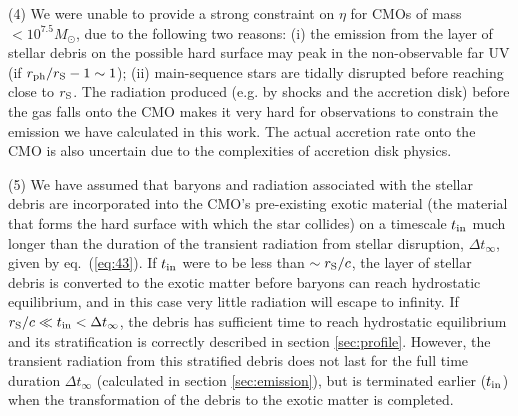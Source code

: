 \documentclass[useAMS,usenatbib]{mn2e}
\begin{document}
(4) We were unable to provide a strong constraint on $\eta$ for CMOs of
mass $< 10^{7.5} M_{\odot}$, due to the following two reasons: (i) the
emission from the layer of stellar debris on the possible hard surface
may peak in the non-observable far UV (if $r_{\rm ph}/r_{\rm
  S}-1\sim1$); (ii) main-sequence stars are tidally disrupted before
reaching close to $r_{\rm S}$. The radiation produced (e.g. by shocks
and the accretion disk) before the gas falls onto the CMO 
makes it very hard for observations to constrain the emission we have
calculated in this work. The actual accretion rate onto the CMO is
also uncertain due to the complexities of accretion disk physics.

(5) We have assumed that baryons and radiation associated with the 
stellar debris are incorporated into the CMO's pre-existing exotic material 
(the material that forms the hard surface with which the star collides) on
a timescale $t_{\rm in}$ much longer than the duration of the transient 
radiation from stellar disruption, $\Delta t_{\infty}$, given by 
eq.~(\ref{eq:43}). 
If $t_{\rm in}$ were to be less than $\sim r_{\rm S}/c$, the layer of 
stellar debris is converted to the exotic matter before baryons can 
reach hydrostatic equilibrium, and in this case very little radiation 
will escape to infinity. If $ r_{\rm S}/c\ll t_{\rm in}< \Delta
t_{\infty}$, the debris has sufficient time to reach hydrostatic 
equilibrium and its stratification is correctly described in section
\ref{sec:profile}. However, the transient radiation from this stratified debris
does not last for the full time duration $\Delta t_{\infty}$ (calculated in
section \ref{sec:emission}), but is terminated earlier ($t_{\rm in}$)
when the transformation of the debris to the exotic matter is
completed.
\end{document}
